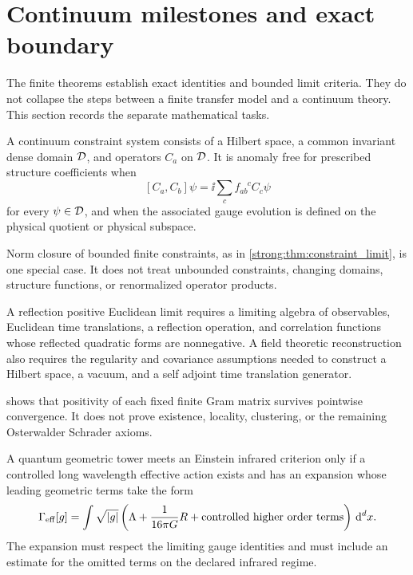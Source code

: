 \section{Continuum milestones and exact boundary}\label{strong:section:014}\label{strong:sec:boundary}

The finite theorems establish exact identities and bounded limit criteria. They do not collapse the steps between a finite transfer model and a continuum theory. This section records the separate mathematical tasks.

\begin{definition}\label{strong:definition:011}\label{strong:def:anomaly_free_continuum}
A continuum constraint system consists of a Hilbert space, a common invariant dense domain \(\mathcal D\), and operators \(C_a\) on \(\mathcal D\). It is anomaly free for prescribed structure coefficients when
\[
[C_a,C_b]\psi
=
\ii\sum_cf_{ab}^{\phantom{ab}c}C_c\psi
\]
for every \(\psi\in\mathcal D\), and when the associated gauge evolution is defined on the physical quotient or physical subspace.
\end{definition}

Norm closure of bounded finite constraints, as in \cref{strong:thm:constraint_limit}, is one special case. It does not treat unbounded constraints, changing domains, structure functions, or renormalized operator products.

\begin{definition}\label{strong:definition:012}\label{strong:def:reflection_positive_limit}
A reflection positive Euclidean limit requires a limiting algebra of observables, Euclidean time translations, a reflection operation, and correlation functions whose reflected quadratic forms are nonnegative. A field theoretic reconstruction also requires the regularity and covariance assumptions needed to construct a Hilbert space, a vacuum, and a self adjoint time translation generator.
\end{definition}

 shows that positivity of each fixed finite Gram matrix survives pointwise convergence. It does not prove existence, locality, clustering, or the remaining Osterwalder Schrader axioms.

\begin{definition}\label{strong:definition:013}\label{strong:def:einstein_criterion}
A quantum geometric tower meets an Einstein infrared criterion only if a controlled long wavelength effective action exists and has an expansion whose leading geometric terms take the form
\[
\Gamma_{\rm eff}[g]
=
\int
\sqrt{\left\lvert g\right\rvert}
\left(
\Lambda
+
\frac{1}{16\pi G}R
+
\text{controlled higher order terms}
\right)
\,\mathrm d^dx.
\]
The expansion must respect the limiting gauge identities and must include an estimate for the omitted terms on the declared infrared regime.
\end{definition}

